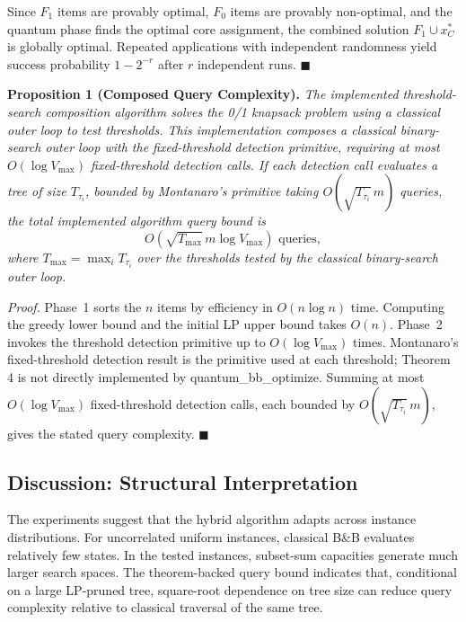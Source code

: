 \documentclass[conference]{IEEEtran} \IEEEoverridecommandlockouts
\begin{document}
Since $F_1$ items are provably optimal, $F_0$ items are provably non-optimal, and the quantum phase finds the optimal core assignment, the combined solution $F_1 \cup x^*_C$ is globally optimal. Repeated applications with independent randomness yield success probability $1 - 2^{-r}$ after $r$ independent runs. \hfill$\blacksquare$

\textbf{Proposition 1 (Composed Query Complexity).} \textit{The implemented threshold-search composition algorithm solves the 0/1 knapsack problem using a classical outer loop to test thresholds. This implementation composes a classical binary-search outer loop with the fixed-threshold detection primitive, requiring at most $O(\log V_{\max})$ fixed-threshold detection calls. If each detection call evaluates a tree of size $T_{\tau_i}$, bounded by Montanaro's primitive taking $O(\sqrt{T_{\tau_i}}\,m)$ queries, the total implemented algorithm query bound is}
\begin{equation}
    O\!\left(\sqrt{T_{\max}}\,m\log V_{\max}\right) \text{ queries},
    \label{eq:totalcomplexity}
\end{equation}
\textit{where $T_{\max} = \max_i T_{\tau_i}$ over the thresholds tested by the classical binary-search outer loop.}

\textit{Proof.} Phase~1 sorts the $n$ items by efficiency in $O(n \log n)$ time. Computing the greedy lower bound and the initial LP upper bound takes $O(n)$. Phase~2 invokes the threshold detection primitive up to $O(\log V_{\max})$ times. Montanaro's fixed-threshold detection result is the primitive used at each threshold; Theorem 4 is not directly implemented by quantum\_bb\_optimize. Summing at most $O(\log V_{\max})$ fixed-threshold detection calls, each bounded by $O(\sqrt{T_{\tau_i}}\,m)$, gives the stated query complexity. \hfill$\blacksquare$

\subsection{Discussion: Structural Interpretation}
The experiments suggest that the hybrid algorithm adapts across instance distributions. For uncorrelated uniform instances, classical B\&B evaluates relatively few states. In the tested instances, subset-sum capacities generate much larger search spaces. The theorem-backed query bound indicates that, conditional on a large LP-pruned tree, square-root dependence on tree size can reduce query complexity relative to classical traversal of the same tree.
\end{document}
